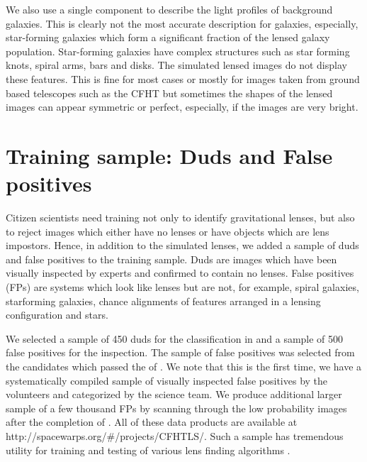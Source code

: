 \documentclass[useAMS,usenatbib,a4paper]{mn2e}
\begin{document}
We also use a single component to describe the light profiles of
background galaxies. This is clearly not the most accurate description for
galaxies, especially, star-forming galaxies which form a significant fraction
of the lensed galaxy population. Star-forming galaxies have complex structures
such as star forming knots, spiral arms, bars and disks. The simulated lensed
images do not display these features. This is fine for most cases or
mostly for images taken from ground based telescopes such as the CFHT
but sometimes the shapes of the lensed images can appear symmetric or
perfect, especially, if the images are very bright. 


%


\section{Training sample: Duds and False positives}
\label{sec:dfp}

Citizen scientists need training not only to identify gravitational
lenses, but also to reject images which either have no lenses or have
objects which are lens impostors. Hence, in addition to the simulated
lenses, we added a sample of duds and false positives to the training
sample. Duds are images which have been visually inspected by experts
and confirmed to contain no lenses. False positives (FPs) are systems
which look like lenses but are not, for example, spiral galaxies,
starforming galaxies, chance alignments of features arranged in a
lensing configuration and stars.

We selected a sample of 450 duds for the \StageOne classification in \sw
and a sample of 500 false positives for the \StageTwo inspection. The
sample of false positives was selected from the candidates which passed
the \StageOne of \sw. We note that this is the first time, we have a
systematically compiled sample of visually inspected false positives by
the \sw volunteers and categorized by the science team. We produce
additional larger sample of a few thousand FPs by scanning through the
low probability images after the completion of \StageTwo. All of these
data products are available at
http://spacewarps.org/\#/projects/CFHTLS/. Such a sample has tremendous
utility for training and testing of various lens finding algorithms
\citep[e.g.,][]{Chan2014}.
\end{document}
